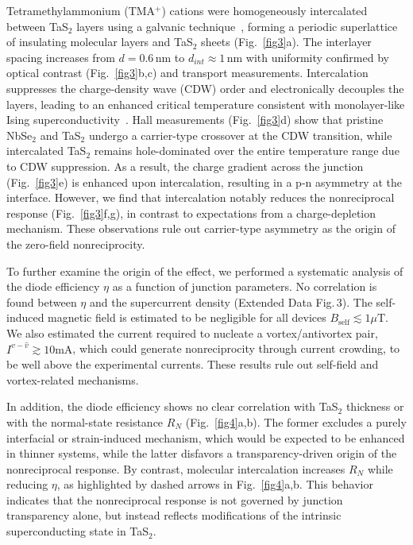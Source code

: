 \documentclass[twocolumn,secnumarabic,amssymb, nobibnotes, aps, prl, superscriptaddress]{revtex4-2}
\begin{document}
Tetramethylammonium (TMA$^+$) cations were homogeneously intercalated between TaS$_2$ layers using a galvanic technique~\cite{Tezze2026,Mar2025}, forming a periodic superlattice of insulating molecular layers and TaS$_2$ sheets (Fig.~\ref{fig3}a). The interlayer spacing increases from $d=0.6\, \text{nm}$ to $d_{int} \approx 1\, \text{nm}$ with uniformity confirmed by optical contrast (Fig.~\ref{fig3}b,c) and transport measurements. Intercalation suppresses the charge-density wave (CDW) order and electronically decouples the layers, leading to an enhanced critical temperature consistent with monolayer-like Ising superconductivity~\cite{Mar2025}. Hall measurements (Fig.~\ref{fig3}d) show that pristine NbSe$_2$ and TaS$_2$ undergo a carrier-type crossover at the CDW transition, while intercalated TaS$_2$ remains hole-dominated over the entire temperature range due to CDW suppression. As a result, the charge gradient across the junction (Fig.~\ref{fig3}e) is enhanced upon intercalation, resulting in a p-n asymmetry at the interface. However, we find that intercalation notably reduces the nonreciprocal response (Fig.~\ref{fig3}f,g), in contrast to expectations from a charge-depletion mechanism. These observations rule out carrier-type asymmetry as the origin of the zero-field nonreciprocity.

To further examine the origin of the effect, we performed a systematic analysis of the diode efficiency $\eta$ as a function of junction parameters. No correlation is found between $\eta$ and the supercurrent density (Extended Data Fig.\,3). The self-induced magnetic field is estimated to be negligible for all devices $B_{\mathrm{self}} \lesssim 1\mu\mathrm{T}$. We also estimated the current required to nucleate a vortex/antivortex pair, $I^{v-\hat{v}} \gtrsim 10\mathrm{mA}$, which could generate nonreciprocity through current crowding, to be well above the experimental currents. These results rule out self-field and vortex-related mechanisms.

In addition, the diode efficiency shows no clear correlation with TaS$_2$ thickness or with the normal-state resistance $R_N$ (Fig.~\ref{fig4}a,b). The former excludes a purely interfacial or strain-induced mechanism, which would be expected to be enhanced in thinner systems, while the latter disfavors a transparency-driven origin of the nonreciprocal response. By contrast, molecular intercalation increases $R_N$ while reducing $\eta$, as highlighted by dashed arrows in Fig.~\ref{fig4}a,b. This behavior indicates that the nonreciprocal response is not governed by junction transparency alone, but instead reflects modifications of the intrinsic superconducting state in TaS$_2$.
\end{document}
